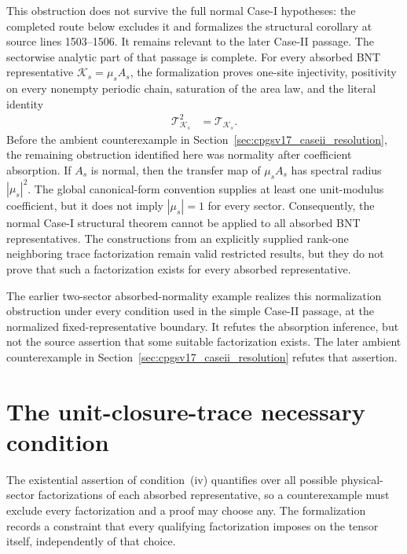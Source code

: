 \documentclass{article}
\begin{document}
This obstruction does not survive the full normal Case-I hypotheses: the
completed route below excludes it and formalizes the structural corollary at
source lines 1503--1506. It remains relevant to the later Case-II passage. The
sectorwise analytic part of that passage is complete. For every absorbed BNT
representative $\mathcal K_s=\mu_sA_s$, the formalization proves one-site
injectivity, positivity on every nonempty periodic chain, saturation of the
area law, and the literal identity
\begin{align}
    \mathcal T_{\mathcal K_s}^2
        &= \mathcal T_{\mathcal K_s}.
    \label{eq:cpgsv17_absorbed_literal_transfer_idempotence}
\end{align}
Before the ambient counterexample in
Section~\ref{sec:cpgsv17_caseii_resolution}, the remaining obstruction
identified here was normality after coefficient absorption. If $A_s$ is
normal, then the transfer map of $\mu_sA_s$ has spectral radius $|\mu_s|^2$.
The global canonical-form convention supplies at least one unit-modulus
coefficient, but it does not imply $|\mu_s|=1$ for every sector. Consequently,
the normal Case-I structural theorem cannot be applied to all absorbed BNT
representatives. The constructions from an explicitly supplied rank-one
neighboring trace factorization remain valid restricted results, but they do
not prove that such a factorization exists for every absorbed representative.

The earlier two-sector absorbed-normality example
realizes this normalization obstruction under every condition used in the
simple Case-II passage, at the normalized fixed-representative boundary. It
refutes the absorption inference, but not the source assertion that some
suitable factorization exists. The later ambient counterexample in
Section~\ref{sec:cpgsv17_caseii_resolution} refutes that assertion.

\section{The unit-closure-trace necessary condition}
\label{sec:cpgsv17_unit_closure_trace}

The existential assertion of condition~(iv) quantifies over all possible
physical-sector factorizations of each absorbed representative, so a
counterexample must exclude every factorization and a proof may choose any.
The formalization records a constraint that every qualifying factorization
imposes on the tensor itself, independently of that choice.
\end{document}
